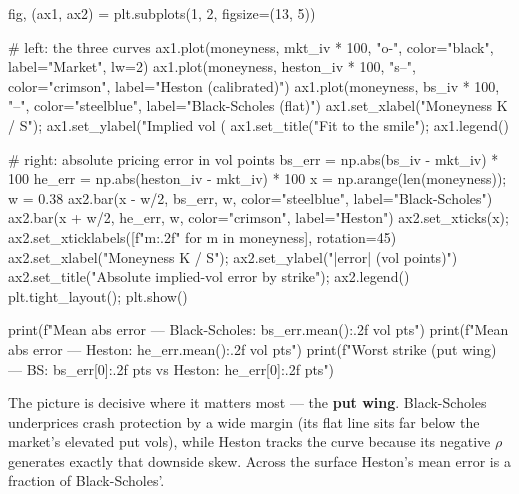 \documentclass{pyportfolios-note}
\begin{document}

\noteneedroom{150bp}

\begin{notecode}
fig, (ax1, ax2) = plt.subplots(1, 2, figsize=(13, 5))

# left: the three curves
ax1.plot(moneyness, mkt_iv * 100, "o-", color="black", label="Market", lw=2)
ax1.plot(moneyness, heston_iv * 100, "s--", color="crimson", label="Heston (calibrated)")
ax1.plot(moneyness, bs_iv * 100, "--", color="steelblue", label="Black-Scholes (flat)")
ax1.set_xlabel("Moneyness  K / S"); ax1.set_ylabel("Implied vol (%
ax1.set_title("Fit to the smile"); ax1.legend()

# right: absolute pricing error in vol points
bs_err = np.abs(bs_iv - mkt_iv) * 100
he_err = np.abs(heston_iv - mkt_iv) * 100
x = np.arange(len(moneyness)); w = 0.38
ax2.bar(x - w/2, bs_err, w, color="steelblue", label="Black-Scholes")
ax2.bar(x + w/2, he_err, w, color="crimson", label="Heston")
ax2.set_xticks(x); ax2.set_xticklabels([f"{m:.2f}" for m in moneyness], rotation=45)
ax2.set_xlabel("Moneyness  K / S"); ax2.set_ylabel("|error| (vol points)")
ax2.set_title("Absolute implied-vol error by strike"); ax2.legend()
plt.tight_layout(); plt.show()

print(f"Mean abs error — Black-Scholes: {bs_err.mean():.2f} vol pts")
print(f"Mean abs error — Heston:        {he_err.mean():.2f} vol pts")
print(f"Worst strike (put wing) — BS: {bs_err[0]:.2f} pts  vs  Heston: {he_err[0]:.2f} pts")
\end{notecode}

The picture is decisive where it matters most — the \textbf{put wing}.
Black-Scholes underprices crash protection by a wide margin (its flat line sits
far below the market's elevated put vols), while Heston tracks the curve because
its negative $\rho$ generates exactly that downside skew. Across the surface
Heston's mean error is a fraction of Black-Scholes'.

\noteneedroom{300bp}
\end{document}
